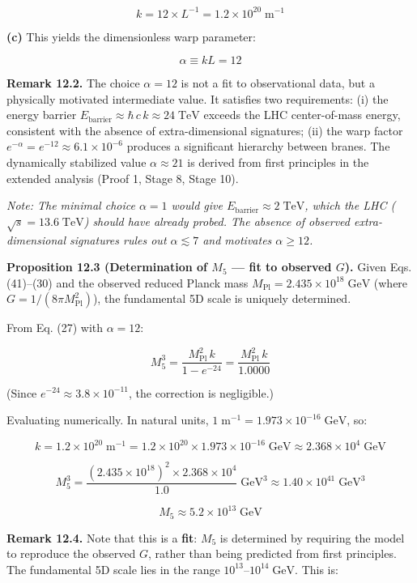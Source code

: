 \documentclass[
  11pt,
]{article}
\begin{document}
\[k = 12 \times L^{-1} = 1.2 \times 10^{20}\;\text{m}^{-1} \tag{42}\]

\textbf{(c)} This yields the dimensionless warp parameter:

\[\alpha \equiv kL = 12 \tag{43}\]

\textbf{Remark 12.2.} The choice \(\alpha = 12\) is not a fit to
observational data, but a physically motivated intermediate value. It
satisfies two requirements: (i) the energy barrier
\(E_{\text{barrier}} \approx \hbar\,c\,k \approx 24\;\text{TeV}\)
exceeds the LHC center-of-mass energy, consistent with the absence of
extra-dimensional signatures; (ii) the warp factor
\(e^{-\alpha} = e^{-12} \approx 6.1 \times 10^{-6}\) produces a
significant hierarchy between branes. The dynamically stabilized value
\(\alpha \approx 21\) is derived from first principles in the extended
analysis (Proof 1, Stage 8, Stage 10).

\emph{Note: The minimal choice \(\alpha = 1\) would give
\(E_{\text{barrier}} \approx 2\;\text{TeV}\), which the LHC
(\(\sqrt{s} = 13.6\;\text{TeV}\)) should have already probed. The
absence of observed extra-dimensional signatures rules out
\(\alpha \lesssim 7\) and motivates \(\alpha \geq 12\).}

\textbf{Proposition 12.3 (Determination of \(M_5\) --- fit to observed
\(G\)).} Given Eqs. (41)--(30) and the observed reduced Planck mass
\(M_{\text{Pl}} = 2.435 \times 10^{18}\;\text{GeV}\) (where
\(G = 1/(8\pi M_{\text{Pl}}^2)\)), the fundamental 5D scale is uniquely
determined.

From Eq. (27) with \(\alpha = 12\):

\[M_5^3 = \frac{M_{\text{Pl}}^2\,k}{1 - e^{-24}} = \frac{M_{\text{Pl}}^2\,k}{1.0000} \tag{44}\]

(Since \(e^{-24} \approx 3.8 \times 10^{-11}\), the correction is
negligible.)

Evaluating numerically. In natural units,
\(1\;\text{m}^{-1} = 1.973 \times 10^{-16}\;\text{GeV}\), so:

\[k = 1.2 \times 10^{20}\;\text{m}^{-1} = 1.2 \times 10^{20} \times 1.973 \times 10^{-16}\;\text{GeV} \approx 2.368 \times 10^{4}\;\text{GeV} \tag{45}\]

\[M_5^3 = \frac{(2.435 \times 10^{18})^2 \times 2.368 \times 10^{4}}{1.0}\;\text{GeV}^3 \approx 1.40 \times 10^{41}\;\text{GeV}^3 \tag{46}\]

\[\boxed{M_5 \approx 5.2 \times 10^{13}\;\text{GeV}} \tag{47}\]

\textbf{Remark 12.4.} Note that this is a \textbf{fit}: \(M_5\) is
determined by requiring the model to reproduce the observed \(G\),
rather than being predicted from first principles. The fundamental 5D
scale lies in the range \(10^{13}\)--\(10^{14}\;\text{GeV}\). This is:
\end{document}

